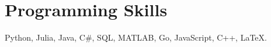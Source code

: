 \documentclass[letterpaper,11pt]{article}
\newcommand{\resumeItem}[2]{
  \item\small{
    \textbf{#1}{: #2 \vspace{-2pt}}
  }
}
\newcommand{\resumeSubItem}[2]{\resumeItem{#1}{#2}\vspace{-4pt}}
\newcommand{\resumeSubHeadingListStart}{\begin{itemize}[leftmargin=*]}
\newcommand{\resumeSubHeadingListEnd}{\end{itemize}}
\begin{document}
\section{Programming Skills}
Python, Julia, Java, C\#, SQL, MATLAB, Go, JavaScript, C++, \LaTeX.


\end{document}
